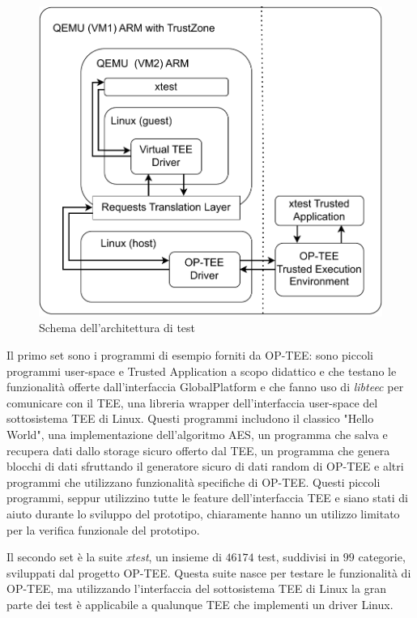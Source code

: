 \documentclass[12pt,italian]{report}
\begin{document}
\begin{figure}
    \centering
    \includegraphics{immagini/testing-architecture}
    \caption{Schema dell'architettura di test}
    \label{fig:architettura-di-test}
\end{figure}

Il primo set sono i programmi di esempio forniti da OP-TEE: sono piccoli
programmi user-space e Trusted Application a scopo didattico e che testano le
funzionalità offerte dall'interfaccia GlobalPlatform e che fanno uso di
\textit{libteec} per comunicare con il TEE, una libreria wrapper
dell'interfaccia user-space del sottosistema TEE di Linux.
Questi programmi includono il classico "Hello World", una implementazione
dell'algoritmo AES, un programma che salva e recupera dati dallo storage
sicuro offerto dal TEE, un programma che genera blocchi di dati
sfruttando il generatore sicuro di dati random di OP-TEE e altri
programmi che utilizzano funzionalità specifiche di OP-TEE.
Questi piccoli programmi, seppur utilizzino tutte le feature dell'interfaccia
TEE e siano stati di aiuto durante lo sviluppo del prototipo, chiaramente
hanno un utilizzo limitato per la verifica funzionale del prototipo.

Il secondo set è la suite \textit{xtest}, un insieme di
$46174$ test, suddivisi in $99$ categorie, sviluppati dal progetto OP-TEE. 
Questa suite nasce per testare le funzionalità di OP-TEE, ma utilizzando
l'interfaccia del sottosistema TEE di Linux la gran parte dei test è
applicabile a qualunque TEE che implementi un driver Linux. 
\end{document}
